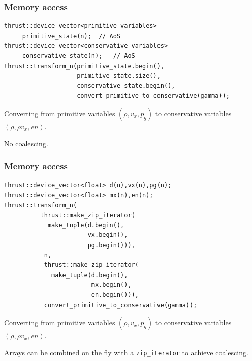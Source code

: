 \documentclass{beamer}
\begin{document}
\begin{frame}[fragile]
\frametitle{Memory access}
\begin{lstlisting}
thrust::device_vector<primitive_variables>    
     primitive_state(n);  // AoS
thrust::device_vector<conservative_variables> 
     conservative_state(n);   // AoS
thrust::transform_n(primitive_state.begin(),
                    primitive_state.size(),
                    conservative_state.begin(),
                    convert_primitive_to_conservative(gamma));
\end{lstlisting} 
\bei
\item Converting from primitive variables $(\rho,v_x, p_g)$ to conservative variables $(\rho,\rho v_x, en)$.
\item No coalescing.
\ebi
\end{frame}

\begin{frame}[fragile]
\frametitle{Memory access}
\begin{lstlisting}
thrust::device_vector<float> d(n),vx(n),pg(n); 
thrust::device_vector<float> mx(n),en(n); 
thrust::transform_n(
          thrust::make_zip_iterator(
            make_tuple(d.begin(),
                       vx.begin(),
                       pg.begin())),
           n,
           thrust::make_zip_iterator(
             make_tuple(d.begin(),
                        mx.begin(),
                        en.begin())),
           convert_primitive_to_conservative(gamma));
\end{lstlisting} 
\bei
\item Converting from primitive variables $(\rho,v_x, p_g)$ to conservative variables $(\rho,\rho v_x, en)$.
\item Arrays can be combined on the fly with a \verb+zip_iterator+ to achieve coalescing.
\ebi
\end{frame}
\end{document}
